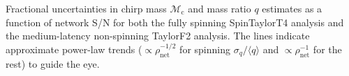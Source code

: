 \label{fig:Mc_q_std_snr} Fractional uncertainties in chirp mass $\mathcal{M}_\mathrm{c}$ and mass ratio $q$ estimates as a function of network S/N for both the fully spinning SpinTaylorT4 analysis and the medium-latency non-spinning TaylorF2 analysis. The lines indicate approximate power-law trends ($\propto \rho_\mathrm{net}^{-1/2}$ for spinning $\sigma_q/\langle q\rangle$ and $\propto \rho_\mathrm{net}^{-1}$ for the rest) to guide the eye.
  
  
  
  
  
  
  
  
